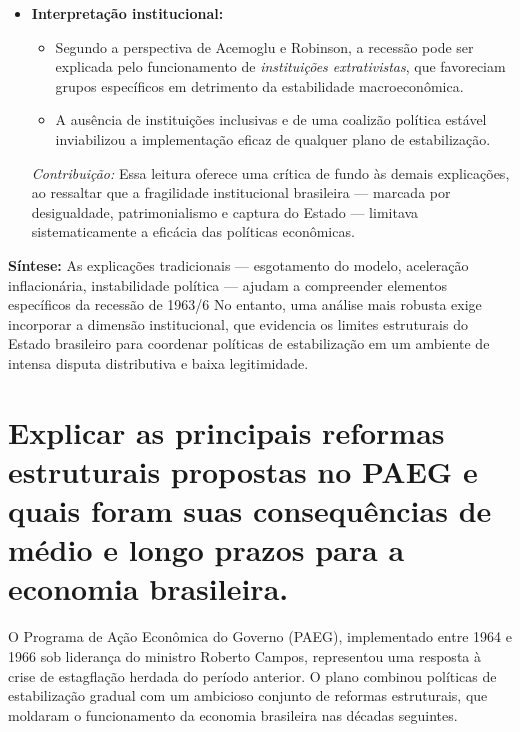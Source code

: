 \documentclass{sciposter}
\begin{document}
\begin{multicols}{3}
\begin{itemize}
    \item \textbf{ Interpretação institucional:}
    \begin{itemize}
        \item Segundo a perspectiva de Acemoglu e Robinson, a recessão pode ser explicada pelo funcionamento de \textit{instituições extrativistas}, que favoreciam grupos específicos em detrimento da estabilidade macroeconômica.
        \item A ausência de instituições inclusivas e de uma coalizão política estável inviabilizou a implementação eficaz de qualquer plano de estabilização.
    \end{itemize}
    \textit{Contribuição:} Essa leitura oferece uma crítica de fundo às demais explicações, ao ressaltar que a fragilidade institucional brasileira — marcada por desigualdade, patrimonialismo e captura do Estado — limitava sistematicamente a eficácia das políticas econômicas.
\end{itemize}

\textbf{Síntese:} As explicações tradicionais — esgotamento do modelo, aceleração inflacionária, instabilidade política — ajudam a compreender elementos específicos da recessão de 1963/6 No entanto, uma análise mais robusta exige incorporar a dimensão institucional, que evidencia os limites estruturais do Estado brasileiro para coordenar políticas de estabilização em um ambiente de intensa disputa distributiva e baixa legitimidade.

\section{\textbf{Explicar as principais reformas estruturais propostas no PAEG e quais foram suas consequências de médio e longo prazos para a economia brasileira.}}

O Programa de Ação Econômica do Governo (PAEG), implementado entre 1964 e 1966 sob liderança do ministro Roberto Campos, representou uma resposta à crise de estagflação herdada do período anterior. O plano combinou políticas de estabilização gradual com um ambicioso conjunto de reformas estruturais, que moldaram o funcionamento da economia brasileira nas décadas seguintes.


\end{multicols}
\end{document}

